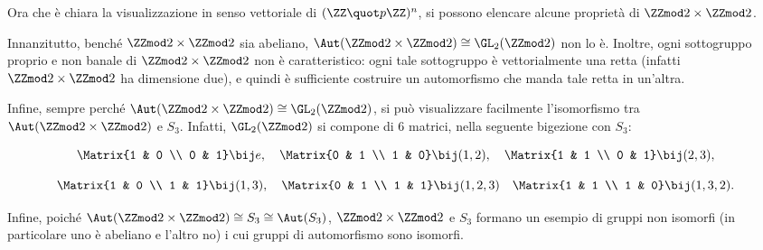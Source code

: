 \documentclass[12pt]{scrartcl}
\begin{document}
	\begin{example}
		Ora che è chiara la visualizzazione in senso vettoriale
		di $(\ZZ \quot p \ZZ)^n$, si possono elencare alcune
		proprietà di $\ZZmod2 \times \ZZmod2$. \medskip
		
		
		Innanzitutto, benché $\ZZmod2 \times \ZZmod2$ sia abeliano,
		$\Aut(\ZZmod2 \times \ZZmod2) \cong \GL_2(\ZZmod2)$ non
		lo è. Inoltre, ogni sottogruppo proprio e non banale di
		$\ZZmod2 \times \ZZmod2$ non è caratteristico: ogni
		tale sottogruppo è vettorialmente una retta (infatti
		$\ZZmod2 \times \ZZmod2$ ha dimensione due), e quindi
		è sufficiente costruire un automorfismo che manda tale
		retta in un'altra. \medskip
		
		
		Infine, sempre perché $\Aut(\ZZmod2 \times \ZZmod2) \cong \GL_2(\ZZmod2)$, si può visualizzare facilmente l'isomorfismo
		tra $\Aut(\ZZmod2 \times \ZZmod2)$ e $S_3$. Infatti,
		$\GL_2(\ZZmod2)$ si compone di $6$ matrici, nella
		seguente bigezione con $S_3$:
		
		\[
			\Matrix{1 & 0 \\ 0 & 1} \bij e, \quad
			\Matrix{0 & 1 \\ 1 & 0} \bij (1, 2), \quad
			\Matrix{1 & 1 \\ 0 & 1} \bij (2, 3),
		\]
		
		\[
			\Matrix{1 & 0 \\ 1 & 1} \bij (1, 3), \quad
			\Matrix{0 & 1 \\ 1 & 1} \bij (1, 2, 3) \quad
			\Matrix{1 & 1 \\ 1 & 0} \bij (1, 3, 2).
		\]
		\vskip 0.1in

		Infine, poiché $\Aut(\ZZmod2 \times \ZZmod2) \cong
		S_3 \cong \Aut(S_3)$, $\ZZmod2 \times \ZZmod2$ e
		$S_3$ formano un esempio di gruppi non isomorfi
		(in particolare uno è abeliano e l'altro no) i cui
		gruppi di automorfismo sono isomorfi.
	\end{example}
\end{document}

